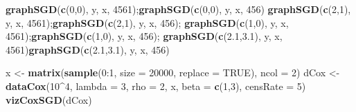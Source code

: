 \documentclass[]{article}
\newenvironment{Shaded}{\begin{snugshade}}{\end{snugshade}}
\newcommand{\KeywordTok}[1]{\textcolor[rgb]{0.13,0.29,0.53}{\textbf{{#1}}}}
\newcommand{\DataTypeTok}[1]{\textcolor[rgb]{0.13,0.29,0.53}{{#1}}}
\newcommand{\DecValTok}[1]{\textcolor[rgb]{0.00,0.00,0.81}{{#1}}}
\newcommand{\FloatTok}[1]{\textcolor[rgb]{0.00,0.00,0.81}{{#1}}}
\newcommand{\StringTok}[1]{\textcolor[rgb]{0.31,0.60,0.02}{{#1}}}
\newcommand{\OtherTok}[1]{\textcolor[rgb]{0.56,0.35,0.01}{{#1}}}
\newcommand{\NormalTok}[1]{{#1}}
\begin{document}
\begin{Shaded}
\begin{Highlighting}[]
\KeywordTok{graphSGD}\NormalTok{(}\KeywordTok{c}\NormalTok{(}\DecValTok{0}\NormalTok{,}\DecValTok{0}\NormalTok{), y, x, }\DecValTok{4561}\NormalTok{);}\KeywordTok{graphSGD}\NormalTok{(}\KeywordTok{c}\NormalTok{(}\DecValTok{0}\NormalTok{,}\DecValTok{0}\NormalTok{), y, x, }\DecValTok{456}\NormalTok{)}
\KeywordTok{graphSGD}\NormalTok{(}\KeywordTok{c}\NormalTok{(}\DecValTok{2}\NormalTok{,}\DecValTok{1}\NormalTok{), y, x, }\DecValTok{4561}\NormalTok{);}\KeywordTok{graphSGD}\NormalTok{(}\KeywordTok{c}\NormalTok{(}\DecValTok{2}\NormalTok{,}\DecValTok{1}\NormalTok{), y, x, }\DecValTok{456}\NormalTok{);}
\KeywordTok{graphSGD}\NormalTok{(}\KeywordTok{c}\NormalTok{(}\DecValTok{1}\NormalTok{,}\DecValTok{0}\NormalTok{), y, x, }\DecValTok{4561}\NormalTok{);}\KeywordTok{graphSGD}\NormalTok{(}\KeywordTok{c}\NormalTok{(}\DecValTok{1}\NormalTok{,}\DecValTok{0}\NormalTok{), y, x, }\DecValTok{456}\NormalTok{);}
\KeywordTok{graphSGD}\NormalTok{(}\KeywordTok{c}\NormalTok{(}\FloatTok{2.1}\NormalTok{,}\FloatTok{3.1}\NormalTok{), y, x, }\DecValTok{4561}\NormalTok{)}\KeywordTok{graphSGD}\NormalTok{(}\KeywordTok{c}\NormalTok{(}\FloatTok{2.1}\NormalTok{,}\FloatTok{3.1}\NormalTok{), y, x, }\DecValTok{456}\NormalTok{)}
\end{Highlighting}
\end{Shaded}

\begin{Shaded}
\begin{Highlighting}[]
\NormalTok{x <-}\StringTok{ }\KeywordTok{matrix}\NormalTok{(}\KeywordTok{sample}\NormalTok{(}\DecValTok{0}\NormalTok{:}\DecValTok{1}\NormalTok{, }\DataTypeTok{size =} \DecValTok{20000}\NormalTok{, }\DataTypeTok{replace =} \OtherTok{TRUE}\NormalTok{), }\DataTypeTok{ncol =} \DecValTok{2}\NormalTok{)}
\NormalTok{dCox <-}\StringTok{ }\KeywordTok{dataCox}\NormalTok{(}\DecValTok{10}\NormalTok{^}\DecValTok{4}\NormalTok{, }\DataTypeTok{lambda =} \DecValTok{3}\NormalTok{, }\DataTypeTok{rho =} \DecValTok{2}\NormalTok{, x, }\DataTypeTok{beta =} \KeywordTok{c}\NormalTok{(}\DecValTok{1}\NormalTok{,}\DecValTok{3}\NormalTok{), }\DataTypeTok{censRate =} \DecValTok{5}\NormalTok{) }
\KeywordTok{vizCoxSGD}\NormalTok{(dCox)}
\end{Highlighting}
\end{Shaded}

\newpage
\end{document}
